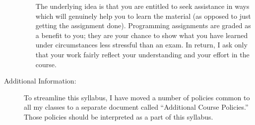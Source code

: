 \documentclass [letterpaper,11pt]{article}
\begin{document}
\begin{description}
\begin{itemize}
\begin{itemize}
                        \end{itemize}
        
        The underlying idea is that you are entitled to seek assistance in ways which will genuinely help you to learn the material (as opposed to just getting the assignment done).  Programming assignments are graded as a benefit to you;  they are your chance to show what you have learned under circumstances less stressful than an exam.  In return, I ask only that your work fairly reflect your understanding and your effort in the course.
        \end{itemize}

\item[Additional Information:] To streamline this syllabus, I have moved a number of policies
common to all my classes to a separate document called ``Additional Course Policies.'' 
Those policies should be interpreted as a part of this syllabus.



\end{description}
\end{document}
